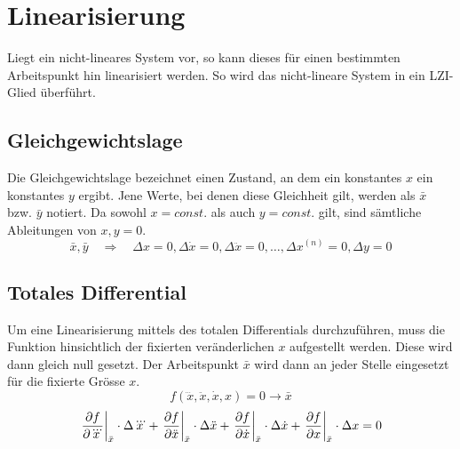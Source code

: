 \section{Linearisierung}
Liegt ein nicht-lineares System vor, so kann dieses für einen
bestimmten Arbeitspunkt hin linearisiert werden. So wird das
nicht-lineare System in ein LZI-Glied überführt.

\subsection{Gleichgewichtslage}
Die Gleichgewichtslage bezeichnet einen Zustand, an dem ein 
konstantes $x$ ein konstantes $y$ ergibt. Jene Werte, bei denen 
diese Gleichheit gilt, werden als $\bar{x}$ bzw. $\bar{y}$ 
notiert. Da sowohl $x=const.$ als auch $y=const.$ gilt, sind
sämtliche Ableitungen von $x,y=0$.
\[  
    \bar{x}, \bar{y}
        \quad \Rightarrow \quad
        \Delta x = 0, 
        \Delta \dot{x} = 0,
        \Delta \ddot{x} = 0,    
        \dots,
        \Delta x^{(n)} = 0,
        \Delta y = 0
\]

\subsection{Totales Differential}
Um eine Linearisierung mittels des totalen Differentials durchzuführen,
muss die Funktion hinsichtlich der fixierten veränderlichen $x$ 
aufgestellt werden. Diese wird dann gleich null gesetzt. 
Der Arbeitspunkt $\bar{x}$ wird dann an jeder Stelle eingesetzt für die 
fixierte Grösse $x$. 
\[ 
    f(\dddot{x}, \ddot{x}, \dot{x}, x) = 0 \rightarrow \bar{x}
\]
\[ 
    \begin{array}{r l} 
		\displaystyle 
            \left. \frac{\partial f}{\partial \dddot{x}}
                \right\rvert_{\bar{x}} \cdot \Delta \dddot{x}
            + \left.\frac{\partial f}{\partial \ddot{x}}
                \right\rvert_{\bar{x}} \cdot \Delta \ddot{x}
            + \left.\frac{\partial f}{\partial \dot{x}}
                \right\rvert_{\bar{x}} \cdot \Delta \dot{x}
            + \left.\frac{\partial f}{\partial x}
                \right\rvert_{\bar{x}} \cdot \Delta x 
            = 0\\
    \end{array} 
\]


